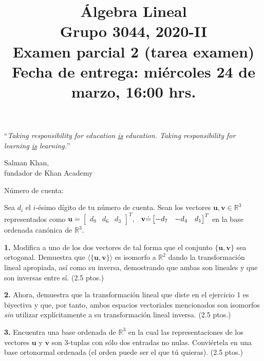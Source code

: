 \documentclass[a4paper]{article}
\begin{document}
\title{Álgebra Lineal \\ Grupo 3044, 2020-II \\ Examen parcial 2 (tarea examen) \\ Fecha de entrega: miércoles 24 de marzo, 16:00 hrs.}
\date{}
\maketitle


\epigraph{``\textit{Taking responsibility for education \underline{is} education. Taking responsibility for learning \underline{is} learning.}''}{\textemdash Salman Khan, \\ fundador de Khan Academy}

Número de cuenta:

\vspace{5mm}

\noindent Sea $d_i$ el $i$-ésimo dígito de tu número de cuenta. Sean los vectores $\mathbf{u},\mathbf{v}\in\mathbb{R}^3$ representados como $\mathbf{u}\dot{=}\begin{bmatrix} d_9 & d_6 & d_3 \end{bmatrix}^T,$ $\hspace{1.5mm} \mathbf{v}\dot{=}\begin{bmatrix} -d_7 & -d_4 & d_1 \end{bmatrix}^T$ en la base ordenada canónica de $\mathbb{R}^3$. 

\vspace{5mm}
\textbf{1.} Modifica a uno de los dos vectores de tal forma que el conjunto $\{\mathbf{u},\mathbf{v}\}$ sea ortogonal. Demuestra que $\langle \{\mathbf{u},\mathbf{v}\}  \rangle$ es isomorfo a $\mathbb{R}^2$ dando la transformación lineal apropiada, así como su inversa, demostrando que ambas son lineales y que son inversas entre sí. (2.5 ptos.)

\vspace{5mm}
\textbf{2.} Ahora, demuestra que la transformación lineal que diste en el ejercicio 1 es biyectiva \textemdash y que, por tanto, ambos espacios vectoriales mencionados son isomorfos\textemdash\hspace{1mm} \emph{sin} utilizar explícitamente a su transformación lineal inversa. (2.5 ptos.)

\vspace{5mm}
\textbf{3.} Encuentra una base ordenada de $\mathbb{R}^3$ en la cual las representaciones de los vectores $\mathbf{u}$ y $\mathbf{v}$ son $3$-tuplas con sólo dos entradas no nulas. Conviértela en una base ortonormal ordenada (el orden puede ser el que tú quieras). (2.5 ptos.)
\end{document}
